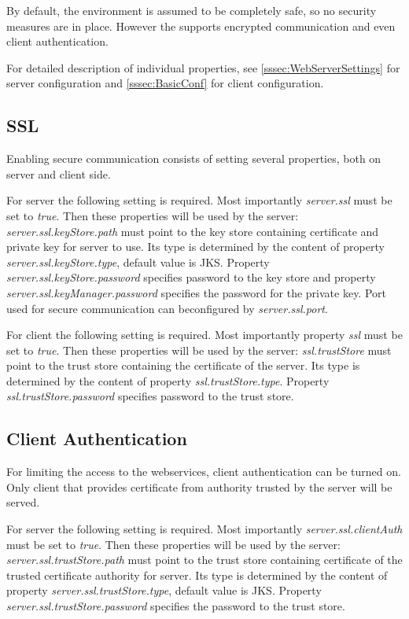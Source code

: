 
By default, the environment is assumed to be completely safe, so no security
measures are in place. However the \textan{} supports encrypted communication
and even client authentication.

For detailed description of individual properties, see
\ref{sssec:WebServerSettings} for server configuration and
\ref{sssec:BasicConf} for client configuration.

\subsection{SSL}

Enabling secure communication consists of setting several properties, both
on server and client side.

For server the following setting is required. Most importantly \emph{server.ssl} must
be set to \emph{true}. Then these properties will be used by the server:
\emph{server.ssl.keyStore.path} must point to the key store containing
certificate and private key for server to use. Its type is determined by
the content of property \emph{server.ssl.keyStore.type}, default value is JKS.
Property \emph{server.ssl.keyStore.password} specifies password to the key
store and property \emph{server.ssl.keyManager.password} specifies the password
for the private key. Port used for secure communication can beconfigured by
\emph{server.ssl.port}.

For client the following setting is required. Most importantly property \emph{ssl} must
be set to \emph{true}. Then these properties will be used by the server:
\emph{ssl.trustStore} must point to the trust store containing the certificate
of the server. Its type is determined by the content of property
\emph{ssl.trustStore.type}. Property \emph{ssl.trustStore.password} specifies
password to the trust store.

\subsection{Client Authentication}

For limiting the access to the webservices, client authentication can be turned
on. Only client that provides certificate from authority trusted by the server
will be served.

For server the following setting is required. Most importantly
\emph{server.ssl.clientAuth} must be set to \emph{true}. Then these properties
will be used by the server: \emph{server.ssl.trustStore.path} must point to the
trust store containing certificate of the trusted certificate authority for
server. Its type is determined by the content of property
\emph{server.ssl.trustStore.type}, default value is JKS. Property
\emph{server.ssl.trustStore.password} specifies the password to the trust
store.

